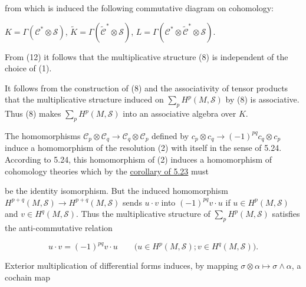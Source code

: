 from which is induced the following commutative diagram on cohomology:

\begin{center}
\par\smallskip
$K=\Gamma(\mathcal C^*\otimes\mathcal S)$,\quad
$\widetilde K=\Gamma(\widetilde{\mathcal C}^*\otimes\mathcal S)$,\quad
$L=\Gamma(\mathcal C^*\otimes\widetilde{\mathcal C}^*\otimes\mathcal S)$.
\end{center}

From (12) it follows that the multiplicative structure (8) is independent of the choice of (1).

It follows from the construction of (8) and the associativity of tensor products that the multiplicative structure induced on $\sum_{p} H^{p}(M,\mathcal{S})$ by (8) is associative. Thus (8) makes $\sum_{p} H^{p}(M,\mathcal{S})$ into an associative algebra over $K$.

The homomorphisms  $ \mathcal{C}_{p} \otimes \mathcal{C}_{q} \to \mathcal{C}_{q} \otimes \mathcal{C}_{p} $ defined by  $ c_{p} \otimes c_{q} \to (-1)^{pq} c_{q} \otimes c_{p} $ induce a homomorphism of the resolution (2) with itself in the sense of 5.24. According to 5.24, this homomorphism of (2) induces a homomorphism of cohomology theories which by the \hyperref[thm:5.23]{corollary of 5.23} must

be the identity isomorphism. But the induced homomorphism  $ H^{p+q}(M,\mathcal{S}) \to H^{p+q}(M,\mathcal{S}) $ sends  $ u \cdot v $ into  $ (-1)^{pq}v \cdot u $ if  $ u \in H^p(M,\mathcal{S}) $ and  $ v \in H^q(M,\mathcal{S}) $. Thus the multiplicative structure of  $ \sum_p H^p(M,\mathcal{S}) $ satisfies the anti-commutative relation

\begin{equation}
\tag{13}\label{eq:5.42:13}
u\cdot v=(-1)^{p q}v\cdot u\qquad\big(u\in H^{p}(M,\mathcal{S});v\in H^{q}(M,\mathcal{S})\big).
\end{equation}

\label{thm:5.43}Exterior multiplication of differential forms induces, by mapping  $ \sigma \otimes \alpha \mapsto \sigma \wedge \alpha $, a cochain map

